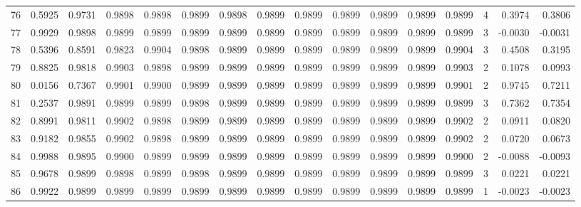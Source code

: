 \begin{tabular}{lrrrrrrrrrrrrrrr}
76  &      0.5925 &  0.9731 &  0.9898 &  0.9898 &  0.9899 &  0.9898 &  0.9899 &  0.9899 &  0.9899 &  0.9899 &   0.9899 &     0.9899 &      4 &                    0.3974 &                     0.3806 \\
77  &      0.9929 &  0.9898 &  0.9899 &  0.9899 &  0.9899 &  0.9899 &  0.9899 &  0.9899 &  0.9899 &  0.9899 &   0.9899 &     0.9899 &      3 &                   -0.0030 &                    -0.0031 \\
78  &      0.5396 &  0.8591 &  0.9823 &  0.9904 &  0.9898 &  0.9899 &  0.9899 &  0.9899 &  0.9899 &  0.9899 &   0.9899 &     0.9904 &      3 &                    0.4508 &                     0.3195 \\
79  &      0.8825 &  0.9818 &  0.9903 &  0.9898 &  0.9899 &  0.9899 &  0.9899 &  0.9899 &  0.9899 &  0.9899 &   0.9899 &     0.9903 &      2 &                    0.1078 &                     0.0993 \\
80  &      0.0156 &  0.7367 &  0.9901 &  0.9900 &  0.9899 &  0.9899 &  0.9899 &  0.9899 &  0.9899 &  0.9899 &   0.9899 &     0.9901 &      2 &                    0.9745 &                     0.7211 \\
81  &      0.2537 &  0.9891 &  0.9899 &  0.9899 &  0.9898 &  0.9899 &  0.9899 &  0.9899 &  0.9899 &  0.9899 &   0.9899 &     0.9899 &      3 &                    0.7362 &                     0.7354 \\
82  &      0.8991 &  0.9811 &  0.9902 &  0.9898 &  0.9899 &  0.9899 &  0.9899 &  0.9899 &  0.9899 &  0.9899 &   0.9899 &     0.9902 &      2 &                    0.0911 &                     0.0820 \\
83  &      0.9182 &  0.9855 &  0.9902 &  0.9898 &  0.9899 &  0.9899 &  0.9899 &  0.9899 &  0.9899 &  0.9899 &   0.9899 &     0.9902 &      2 &                    0.0720 &                     0.0673 \\
84  &      0.9988 &  0.9895 &  0.9900 &  0.9899 &  0.9899 &  0.9899 &  0.9899 &  0.9899 &  0.9899 &  0.9899 &   0.9899 &     0.9900 &      2 &                   -0.0088 &                    -0.0093 \\
85  &      0.9678 &  0.9899 &  0.9898 &  0.9899 &  0.9898 &  0.9899 &  0.9899 &  0.9899 &  0.9899 &  0.9899 &   0.9899 &     0.9899 &      3 &                    0.0221 &                     0.0221 \\
86  &      0.9922 &  0.9899 &  0.9899 &  0.9899 &  0.9899 &  0.9899 &  0.9899 &  0.9899 &  0.9899 &  0.9899 &   0.9899 &     0.9899 &      1 &                   -0.0023 &                    -0.0023 \\

\end{tabular}
